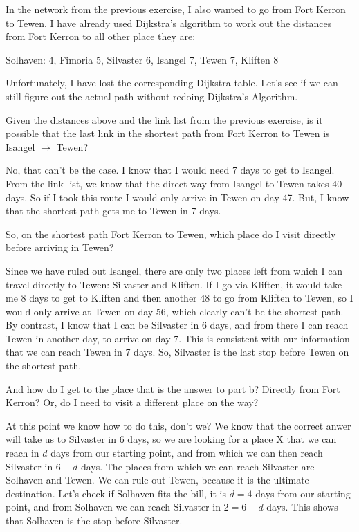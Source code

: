 
In the network from the previous exercise, I also wanted to go from Fort Kerron to Tewen. I have already used Dijkstra's algorithm to work out the distances from Fort Kerron to all other place they are:
\begin{center}
    Solhaven: 4, Fimoria 5, Silvaster 6, Isangel 7, Tewen 7, Kliften 8 
\end{center}
Unfortunately, I have lost the corresponding Dijkstra table. Let's see if we can still figure out the actual path without redoing Dijkstra's Algorithm. 

\subquestion Given the distances above and the link list from the previous exercise, is it possible that the last link in the shortest path from Fort Kerron to Tewen is Isangel $\rightarrow$ Tewen?

\solution
No, that can't be the case. I know that I would need 7 days to get to Isangel. From the link list, we know that the direct way from Isangel to Tewen takes 40 days. So if I took this route I would only arrive in Tewen on day 47. But, I know that the shortest path gets me to Tewen in 7 days.

\subquestion So, on the shortest path Fort Kerron to Tewen, which place do I visit directly before arriving in Tewen?

\solution
Since we have ruled out Isangel, there are only two places left from which I can travel directly to Tewen: Silvaster and Kliften. If I go via Kliften, it would take me 8 days to get to Kliften and then another 48 to go from Kliften to Tewen, so I would only arrive at Tewen on day 56, which clearly can't be the shortest path. By contrast, I know that I can be Silvaster in 6 days, and from there I can reach Tewen in another day, to arrive on day 7. This is consistent with our information that we can reach Tewen in 7 days. So, Silvaster is the last stop before Tewen on the shortest path. 

\subquestion And how do I get to the place that is the answer to part b? Directly from Fort Kerron? Or, do I need to visit a different place on the way?

\solution
At this point we know how to do this, don't we? We know that the correct anwer will take us to Silvaster in 6 days, so we are looking for a place X that we can reach in $d$ days from our starting point, and from which we can then reach Silvaster in $6-d$ days. The places from which we can reach Silvaster are Solhaven and Tewen. We can rule out Tewen, because it is the ultimate destination. Let's check if Solhaven fits the bill, it is $d=4$ days from our starting point, and from Solhaven we can reach Silvaster in $2=6-d$ days. This shows that Solhaven is the stop before Silvaster.     

